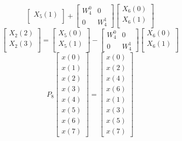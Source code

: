 \documentclass[journal,12pt,twocolumn]{IEEEtran}
\renewcommand\thesection{\arabic{section}}
\begin{document}
\begin{enumerate}[label=\arabic*.,ref=\thesection.\theenumi]
\begin{equation}
\begin{bmatrix}
			X_{5}(1)\\ 
		\end{bmatrix}
		+
		\begin{bmatrix}
			W^{0}_{4} & 0\\
			0 & W^{1}_{4}
		\end{bmatrix}
		\begin{bmatrix}
			X_{6}(0) \\ 
			X_{6}(1) \\ 
		\end{bmatrix}
	\end{equation}
	\begin{equation}
		\begin{bmatrix}
			X_{2}(2) \\ 
			X_{2}(3)\\ 
		\end{bmatrix}
		=
		\begin{bmatrix}
			X_{5}(0) \\ 
			X_{5}(1)\\ 
		\end{bmatrix}
		-
		\begin{bmatrix}
			W^{0}_{4} & 0\\
			0 & W^{1}_{4}
		\end{bmatrix}
		\begin{bmatrix}
			X_{6}(0) \\ 
			X_{6}(1) \\ 
		\end{bmatrix}
	\end{equation}
	\begin{equation}
		P_{8}
		\begin{bmatrix}
			x(0) \\ 
			x(1) \\ 
			x(2) \\ 
			x(3) \\ 
			x(4) \\ 
			x(5) \\
			x(6) \\
			x(7)
		\end{bmatrix}
		= 
		\begin{bmatrix}
			x(0) \\ 
			x(2) \\ 
			x(4) \\ 
			x(6) \\
			x(1) \\ 
			x(3) \\ 
			x(5) \\
			x(7)
		\end{bmatrix}

\end{equation}
\end{enumerate}
\end{document}

